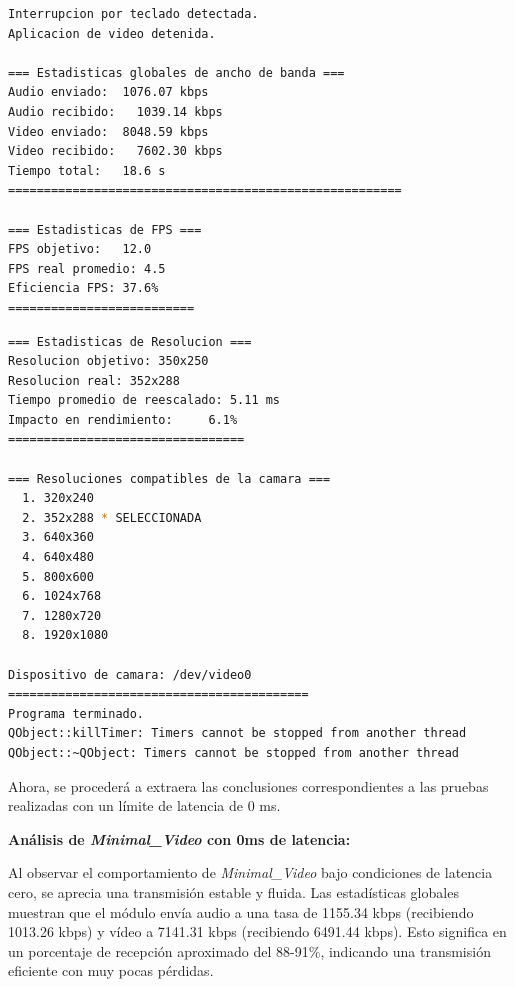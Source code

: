 \begin{lstlisting}[language=bash,basicstyle=\ttfamily\scriptsize]
Interrupcion por teclado detectada.
Aplicacion de video detenida.

=== Estadisticas globales de ancho de banda ===
Audio enviado:	1076.07 kbps
Audio recibido:   1039.14 kbps
Video enviado:	8048.59 kbps
Video recibido:   7602.30 kbps
Tiempo total: 	18.6 s
=======================================================

=== Estadisticas de FPS ===
FPS objetivo: 	12.0
FPS real promedio: 4.5
Eficiencia FPS:	37.6%
==========================
\end{lstlisting}

\begin{lstlisting}[language=bash,basicstyle=\ttfamily\scriptsize]
=== Estadisticas de Resolucion ===
Resolucion objetivo: 350x250
Resolucion real: 352x288
Tiempo promedio de reescalado: 5.11 ms
Impacto en rendimiento:    	6.1%
=================================

=== Resoluciones compatibles de la camara ===
  1. 320x240
  2. 352x288 * SELECCIONADA
  3. 640x360
  4. 640x480
  5. 800x600
  6. 1024x768
  7. 1280x720
  8. 1920x1080

Dispositivo de camara: /dev/video0
==========================================
Programa terminado.
QObject::killTimer: Timers cannot be stopped from another thread
QObject::~QObject: Timers cannot be stopped from another thread
\end{lstlisting}
\vspace{\baselineskip}

\newpage

Ahora, se procederá a extraera las conclusiones correspondientes a las pruebas realizadas con un límite de latencia de 0 ms.
\vspace{\baselineskip}

\textbf{Análisis de \textit{Minimal\_Video} con 0ms de latencia:}
\vspace{\baselineskip}

Al observar el comportamiento de \textit{Minimal\_Video} bajo condiciones de latencia cero, se aprecia una transmisión estable y fluida. Las estadísticas globales muestran que el módulo envía audio a una tasa de 1155.34 kbps (recibiendo 1013.26 kbps) y vídeo a 7141.31 kbps (recibiendo 6491.44 kbps). Esto significa en un porcentaje de recepción aproximado del 88-91\%, indicando una transmisión eficiente con muy pocas pérdidas.
\vspace{\baselineskip}

